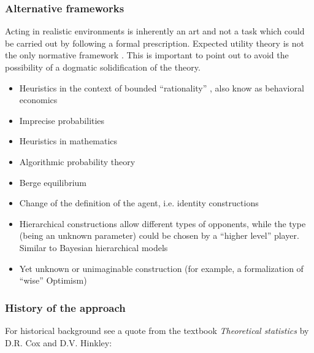 \documentclass{article}
\theoremstyle{definition}
\begin{document}
\subsubsection{Alternative frameworks}

Acting in realistic environments is inherently an art and not a task which could be carried out by following a formal prescription.
Expected utility theory \cite{plato:ExpectedUtility} is not the only normative framework \cite{sep:NormativeTheories}. This is important to point out to avoid the possibility of a dogmatic solidification of the theory.
    \begin{itemize}
        \item Heuristics in the context of bounded ``rationality'' \cite{sep:BoundedRationality}, also know as behavioral economics \cite{paper:Tversky,book:Tversky}
        \item Imprecise probabilities \cite{paper:GilboaSchmeidler,book:GilboaDecision,sep:ImpreciseProbabilities}
        \item Heuristics in mathematics \cite{paper:PolyaHeuristics,book:GoodThinking}
        \item Algorithmic probability theory \cite{book:Solomonoff,book:Vitanyi,arxiv:MullerSolomonoff}
        \item Berge equilibrium \cite{book:BergeEquilibrium}
        \item Change of the definition of the agent, i.e. identity constructions
        \item Hierarchical constructions allow different types of opponents, while the type (being an unknown parameter) could be chosen by a ``higher level'' player.
        Similar to Bayesian hierarchical models \cite{book:BayesianDataAnalysis}
        \item Yet unknown or unimaginable construction (for example, a formalization of ``wise'' Optimism)
    \end{itemize}

\subsubsection{History of the approach}

For historical background see a quote from the textbook {\it Theoretical statistics} by D.R. Cox and D.V. Hinkley:
\end{document}
